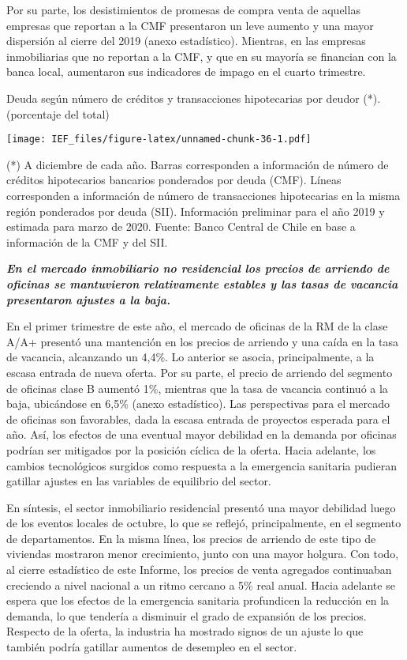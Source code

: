 \documentclass[
]{book}
\begin{document}
Por su parte, los desistimientos de promesas de compra venta de aquellas
empresas que reportan a la CMF presentaron un leve aumento y una mayor
dispersión al cierre del 2019 (anexo estadístico). Mientras, en las empresas
inmobiliarias que no reportan a la CMF, y que en su mayoría se financian con
la banca local, aumentaron sus indicadores de impago en el cuarto trimestre.

Deuda según número de créditos y transacciones hipotecarias por deudor (*).(porcentaje del total)

\texttt{[image: IEF\_files/figure-latex/unnamed-chunk-36-1.pdf]}

(*) A diciembre de cada año. Barras corresponden a información de número de créditos hipotecarios bancarios ponderados por deuda (CMF). Líneas corresponden a información de número de transacciones hipotecarias en la misma región ponderados por deuda (SII). Información preliminar para el año 2019 y estimada para marzo de 2020.
Fuente: Banco Central de Chile en base a información de la CMF y del SII.

\textbf{\emph{En el mercado inmobiliario no residencial los precios de arriendo
de oficinas se mantuvieron relativamente estables y las tasas de
vacancia presentaron ajustes a la baja.}}

En el primer trimestre de este año, el mercado de oficinas de la RM de la clase
A/A+ presentó una mantención en los precios de arriendo y una caída en la
tasa de vacancia, alcanzando un 4,4\%. Lo anterior se asocia, principalmente,
a la escasa entrada de nueva oferta. Por su parte, el precio de arriendo del
segmento de oficinas clase B aumentó 1\%, mientras que la tasa de vacancia
continuó a la baja, ubicándose en 6,5\% (anexo estadístico). Las perspectivas
para el mercado de oficinas son favorables, dada la escasa entrada de proyectos
esperada para el año. Así, los efectos de una eventual mayor debilidad en
la demanda por oficinas podrían ser mitigados por la posición cíclica de la
oferta. Hacia adelante, los cambios tecnológicos surgidos como respuesta a
la emergencia sanitaria pudieran gatillar ajustes en las variables de equilibrio
del sector.

En síntesis, el sector inmobiliario residencial presentó una mayor debilidad
luego de los eventos locales de octubre, lo que se reflejó, principalmente, en
el segmento de departamentos. En la misma línea, los precios de arriendo de
este tipo de viviendas mostraron menor crecimiento, junto con una mayor
holgura. Con todo, al cierre estadístico de este Informe, los precios de venta
agregados continuaban creciendo a nivel nacional a un ritmo cercano a 5\%
real anual. Hacia adelante se espera que los efectos de la emergencia sanitaria
profundicen la reducción en la demanda, lo que tendería a disminuir el grado
de expansión de los precios. Respecto de la oferta, la industria ha mostrado
signos de un ajuste lo que también podría gatillar aumentos de desempleo en
el sector.
\end{document}
